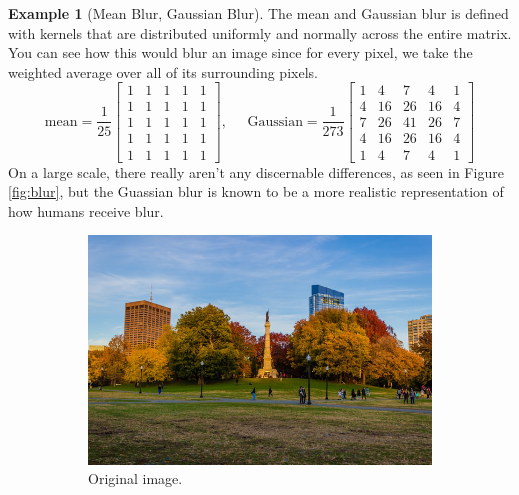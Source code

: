 \documentclass{article}
\theoremstyle{definition}
\newtheorem{example}{Example}[section]
\theoremstyle{remark}
\theoremstyle{definition}
\begin{document}
\begin{example}[Mean Blur, Gaussian Blur]
The mean and Gaussian blur is defined with kernels that are distributed uniformly and normally across the entire matrix. You can see how this would blur an image since for every pixel, we take the weighted average over all of its surrounding pixels. 
\[\text{mean} = \frac{1}{25} \begin{bmatrix} 1 & 1 & 1 & 1 & 1 \\ 1 & 1 & 1 & 1 & 1 \\ 1 & 1 & 1 & 1 & 1 \\ 1 & 1 & 1 & 1 & 1 \\ 1 & 1 & 1 & 1 & 1 \end{bmatrix}, \;\;\;\;\; \text{Gaussian} = \frac{1}{273} \begin{bmatrix} 1 & 4 & 7 & 4 & 1 \\ 4 & 16 & 26 & 16 & 4 \\ 7 & 26 & 41 & 26 & 7 \\ 4 & 16 & 26 & 16 & 4 \\ 1 & 4 & 7 & 4 & 1 \end{bmatrix}\]
On a large scale, there really aren't any discernable differences, as seen in Figure \ref{fig:blur}, but the Guassian blur is known to be a more realistic representation of how humans receive blur. 
\begin{figure}[hbt!]
    \centering
    \begin{subfigure}[b]{0.32\textwidth}
    \centering
        \includegraphics[width=\textwidth]{Images/OpenCV/Park_Full.png}
        \caption{Original image. }
        \label{fig:original_image}
    \end{subfigure}
    \begin{subfigure}[b]{0.32\textwidth}

\end{subfigure}
\end{figure}
\end{example}
\end{document}
